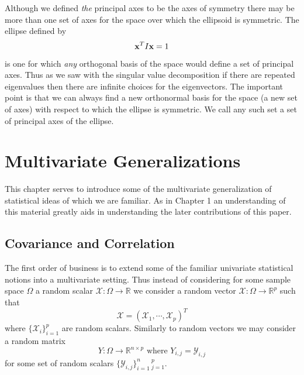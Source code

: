 \documentclass{book}
\newcommand{\bs}[1]{\boldsymbol{#1}}
\begin{document}
Although we defined \emph{the} principal axes to be the axes of symmetry there may be more than one set of axes for the space over which the ellipsoid is symmetric. The ellipse defined by
$$
{\bf x}^TI{\bf x}=1
$$
is one for which \emph{any} orthogonal basis of the space would define a set of principal axes. Thus as we saw with the singular value decomposition if there are repeated eigenvalues then there are infinite choices for the eigenvectors. The important point is that we can always find a new orthonormal basis for the space (a new set of axes) with respect to which the ellipse is symmetric. We call any such set a set of principal axes of the ellipse.















\chapter{Multivariate Generalizations}

This chapter serves to introduce some of the multivariate generalization of statistical ideas of which we are familiar. As in Chapter 1 an understanding of this material greatly aids in understanding the later contributions of this paper. 


\section{Covariance and Correlation}

The first order of business is to extend some of the familiar univariate statistical notions into a multivariate setting. Thus instead of considering for some sample space $\Omega$ a random scalar $\mathscr{X}:\Omega\rightarrow\mathbb{R}$ we consider a random vector $\bs{\mathscr{X}}:\Omega\rightarrow\mathbb{R}^p$ such that
$$
\bs{\mathscr{X}}=(\mathscr{X}_1,\cdots,\mathscr{X}_p)^T
$$
where $\{\mathscr{X}_i\}_{i=1}^{p}$ are random scalars. Similarly to random vectors we may consider a random matrix 
$$
Y:\Omega\rightarrow\mathbb{R}^{n\times p}\text{ where }Y_{i,j}=\mathscr{Y}_{i,j}
$$
for some set of random scalars $\{\mathscr{Y}_{i,j}\}_{i=1}^{n} \,_{j=1}^{p}$.
\end{document}
